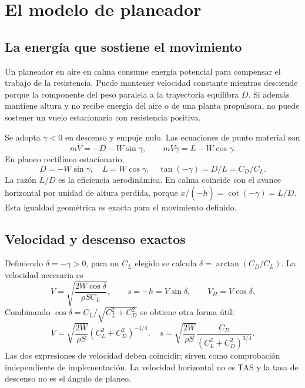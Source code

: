 \chapter{El modelo de planeador}\label{ch:planeador}

\section{La energía que sostiene el movimiento}
Un planeador en aire en calma consume energía potencial para compensar el trabajo de la resistencia. Puede mantener velocidad constante mientras desciende porque la componente del peso paralela a la trayectoria equilibra $D$. Si además mantiene altura y no recibe energía del aire o de una planta propulsora, no puede sostener un vuelo estacionario con resistencia positiva.

Se adopta $\gamma<0$ en descenso y empuje nulo. Las ecuaciones de punto material son
\begin{equation}
m\dot V=-D-W\sin\gamma,\qquad mV\dot\gamma=L-W\cos\gamma.
\end{equation}
En planeo rectilíneo estacionario,
\begin{equation}
D=-W\sin\gamma,\quad L=W\cos\gamma,\quad
\tan(-\gamma)=D/L=C_D/C_L.\label{eq:planeo-exacto}
\end{equation}
La razón $L/D$ es la eficiencia aerodinámica. En calma coincide con el avance horizontal por unidad de altura perdida, porque $\dot x/(-\dot h)=\cot(-\gamma)=L/D$. Esta igualdad geométrica es exacta para el movimiento definido.


\section{Velocidad y descenso exactos}
Definiendo $\delta=-\gamma>0$, para un $C_L$ elegido se calcula $\delta=\arctan(C_D/C_L)$. La velocidad necesaria es
\begin{equation}
V=\sqrt{\frac{2W\cos\delta}{\rho SC_L}},\qquad
s=-\dot h=V\sin\delta,\qquad V_H=V\cos\delta.
\label{eq:planeo-velocidad}
\end{equation}
Combinando $\cos\delta=C_L/\sqrt{C_L^2+C_D^2}$ se obtiene otra forma útil:
\begin{equation}
V=\sqrt{\frac{2W}{\rho S}}(C_L^2+C_D^2)^{-1/4},\quad
s=\sqrt{\frac{2W}{\rho S}}\frac{C_D}{(C_L^2+C_D^2)^{3/4}}.
\end{equation}
Las dos expresiones de velocidad deben coincidir; sirven como comprobación independiente de implementación. La velocidad horizontal no es TAS y la tasa de descenso no es el ángulo de planeo.

